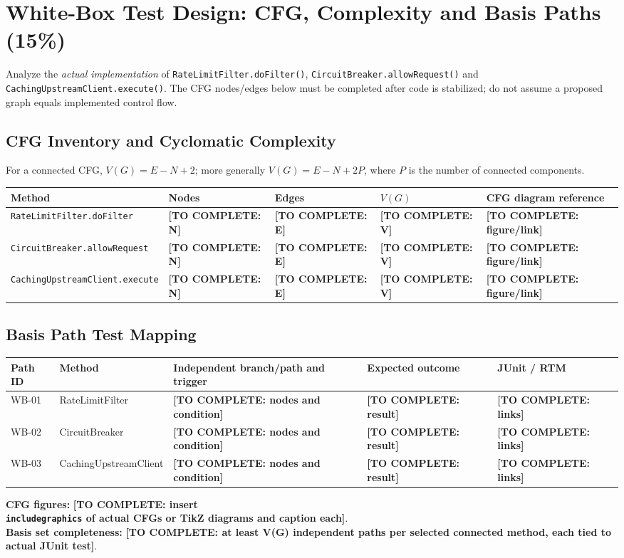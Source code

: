 \documentclass[11pt,a4paper]{article}
\newcommand{\todo}[1]{\textcolor{red!70!black}{\textbf{[TO COMPLETE: #1]}}}
\begin{document}
\section{White-Box Test Design: CFG, Complexity and Basis Paths (15\%)}\label{sec:whitebox}
Analyze the \emph{actual implementation} of \texttt{RateLimitFilter.doFilter()}, \texttt{CircuitBreaker.allowRequest()} and \texttt{CachingUpstreamClient.execute()}. The CFG nodes/edges below must be completed after code is stabilized; do not assume a proposed graph equals implemented control flow.
\subsection{CFG Inventory and Cyclomatic Complexity}
For a connected CFG, $V(G) = E-N+2$; more generally $V(G) = E-N+2P$, where $P$ is the number of connected components.
\begin{longtable}{L{4.6cm} L{1.5cm} L{1.5cm} L{1.5cm} L{3.3cm}}\toprule
\textbf{Method} & \textbf{Nodes} & \textbf{Edges} & $V(G)$ & \textbf{CFG diagram reference}\\\midrule\endhead
\texttt{RateLimitFilter.doFilter} & \todo{N} & \todo{E} & \todo{V} & \todo{figure/link}\\
\texttt{CircuitBreaker.allowRequest} & \todo{N} & \todo{E} & \todo{V} & \todo{figure/link}\\
\texttt{CachingUpstreamClient.execute} & \todo{N} & \todo{E} & \todo{V} & \todo{figure/link}\\\bottomrule\end{longtable}
\subsection{Basis Path Test Mapping}
\begin{longtable}{L{1.4cm} L{2.4cm} L{4.6cm} L{2.8cm} L{2cm}}\toprule
\textbf{Path ID} & \textbf{Method} & \textbf{Independent branch/path and trigger} & \textbf{Expected outcome} & \textbf{JUnit / RTM}\\\midrule\endhead
WB-01 & RateLimitFilter & \todo{nodes and condition} & \todo{result} & \todo{links}\\
WB-02 & CircuitBreaker & \todo{nodes and condition} & \todo{result} & \todo{links}\\
WB-03 & CachingUpstreamClient & \todo{nodes and condition} & \todo{result} & \todo{links}\\\bottomrule\end{longtable}
\textbf{CFG figures:} \todo{insert \texttt{\\includegraphics} of actual CFGs or TikZ diagrams and caption each}.\\
\textbf{Basis set completeness:} \todo{at least V(G) independent paths per selected connected method, each tied to actual JUnit test}.
\end{document}
